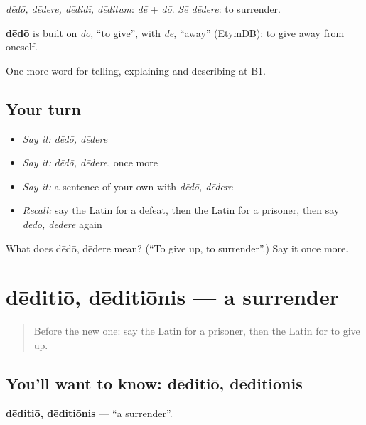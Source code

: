 \emph{dēdō, dēdere, dēdidī, dēditum}: \emph{dē} + \emph{dō}. \emph{Sē dēdere}: to surrender.

\begin{cousinweb}
\textbf{dēdō} is built on \emph{dō}, \textquotedblleft{}to give\textquotedblright{}, with \emph{dē}, \textquotedblleft{}away\textquotedblright{} (EtymDB): to give away from oneself.
\end{cousinweb}

\begin{grammarlens}[title={What you've built}]
One more word for telling, explaining and describing at B1.
\end{grammarlens}

\subsection*{Your turn}
\begin{itemize}
\raggedright
  \item \emph{Say it:} \emph{dēdō, dēdere}
  \item \emph{Say it:} \emph{dēdō, dēdere}, once more
  \item \emph{Say it:} a sentence of your own with \emph{dēdō, dēdere}
  \item \emph{Recall:} say the Latin for a defeat, then the Latin for a prisoner, then say \emph{dēdō, dēdere} again
\end{itemize}

\begin{tcolorbox}[breakable,colback=teal!4,colframe=teal!35!black,title={Before you move on}]
What does dēdō, dēdere mean? (\textquotedblleft{}To give up, to surrender\textquotedblright{}.) Say it once more.
\end{tcolorbox}
\section[dēditiō, dēditiōnis]{dēditiō, dēditiōnis — a surrender}

\label{lesson:LA-C343-deditio}



\begin{quote}
Before the new one: say the Latin for a prisoner, then the Latin for to give up.
\end{quote}

\subsection*{You'll want to know: dēditiō, dēditiōnis}
\textbf{dēditiō, dēditiōnis} — \textquotedblleft{}a surrender\textquotedblright{}.

